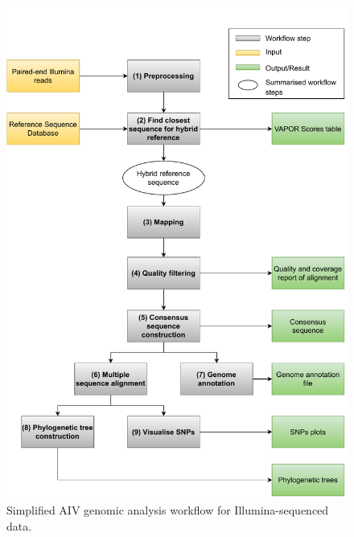 \begin{figure}[ht!]
	\includegraphics[width=1\textwidth]{media/3-aiv.pdf}
	\caption{Simplified \ac{AIV} genomic analysis workflow for Illumina-sequenced data.}
	\label{fig:3-aiv-wf}
\end{figure}

